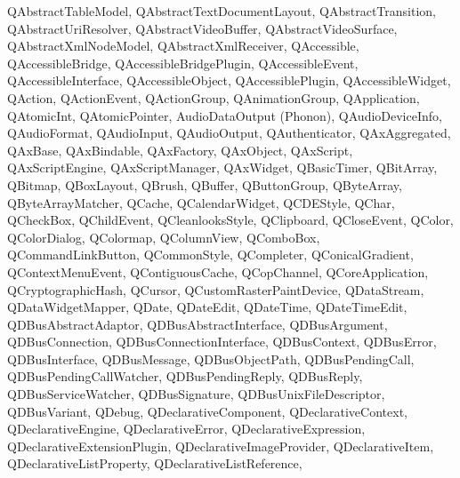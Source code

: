 {{        QAbstractTableModel,
        QAbstractTextDocumentLayout,
        QAbstractTransition,
        QAbstractUriResolver,
        QAbstractVideoBuffer,
        QAbstractVideoSurface,
        QAbstractXmlNodeModel,
        QAbstractXmlReceiver,
        QAccessible,
        QAccessibleBridge,
        QAccessibleBridgePlugin,
        QAccessibleEvent,
        QAccessibleInterface,
        QAccessibleObject,
        QAccessiblePlugin,
        QAccessibleWidget,
        QAction,
        QActionEvent,
        QActionGroup,
        QAnimationGroup,
        QApplication,
        QAtomicInt,
        QAtomicPointer,
        AudioDataOutput (Phonon),
        QAudioDeviceInfo,
        QAudioFormat,
        QAudioInput,
        QAudioOutput,
        QAuthenticator,
        QAxAggregated,
        QAxBase,
        QAxBindable,
        QAxFactory,
        QAxObject,
        QAxScript,
        QAxScriptEngine,
        QAxScriptManager,
        QAxWidget,
        QBasicTimer,
        QBitArray,
        QBitmap,
        QBoxLayout,
        QBrush,
        QBuffer,
        QButtonGroup,
        QByteArray,
        QByteArrayMatcher,
        QCache,
        QCalendarWidget,
        QCDEStyle,
        QChar,
        QCheckBox,
        QChildEvent,
        QCleanlooksStyle,
        QClipboard,
        QCloseEvent,
        QColor,
        QColorDialog,
        QColormap,
        QColumnView,
        QComboBox,
        QCommandLinkButton,
        QCommonStyle,
        QCompleter,
        QConicalGradient,
        QContextMenuEvent,
        QContiguousCache,
        QCopChannel,
        QCoreApplication,
        QCryptographicHash,
        QCursor,
        QCustomRasterPaintDevice,
        QDataStream,
        QDataWidgetMapper,
        QDate,
        QDateEdit,
        QDateTime,
        QDateTimeEdit,
        QDBusAbstractAdaptor,
        QDBusAbstractInterface,
        QDBusArgument,
        QDBusConnection,
        QDBusConnectionInterface,
        QDBusContext,
        QDBusError,
        QDBusInterface,
        QDBusMessage,
        QDBusObjectPath,
        QDBusPendingCall,
        QDBusPendingCallWatcher,
        QDBusPendingReply,
        QDBusReply,
        QDBusServiceWatcher,
        QDBusSignature,
        QDBusUnixFileDescriptor,
        QDBusVariant,
        QDebug,
        QDeclarativeComponent,
        QDeclarativeContext,
        QDeclarativeEngine,
        QDeclarativeError,
        QDeclarativeExpression,
        QDeclarativeExtensionPlugin,
        QDeclarativeImageProvider,
        QDeclarativeItem,
        QDeclarativeListProperty,
        QDeclarativeListReference,
}}
